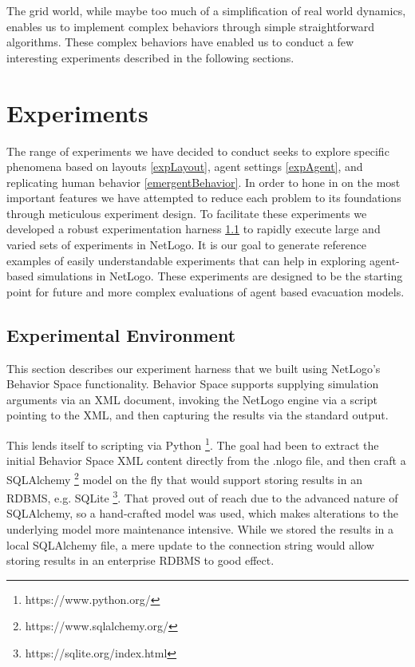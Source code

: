 \documentclass[12pt,letterpaper]{article}
\begin{document}
The grid world, while maybe too much of a simplification of real world dynamics, enables us to implement complex behaviors through simple straightforward algorithms.  These complex behaviors have enabled us to conduct a few interesting experiments described in the following sections.

\section{Experiments}

The range of experiments we have decided to conduct seeks to explore specific phenomena based on layouts \ref{expLayout}, agent settings \ref{expAgent}, and replicating human behavior \ref{emergentBehavior}.  In order to hone in on the most important features we have attempted to reduce each problem to its foundations through meticulous experiment design.  To facilitate these experiments we developed a robust experimentation harness \ref{expEnv} to rapidly execute large and varied sets of experiments in NetLogo.  It is our goal to generate reference examples of easily understandable experiments that can help in exploring agent-based simulations in NetLogo.  These experiments are designed to be the starting point for future and more complex evaluations of agent based evacuation models.


\subsection{Experimental Environment} \label{expEnv}
This section describes our experiment harness that we built using NetLogo's
Behavior Space functionality.  Behavior Space supports supplying simulation arguments via an XML document,
invoking the NetLogo engine via a script pointing to the XML, and then capturing
the results via the standard output.

This lends itself to scripting via Python \footnote{https://www.python.org/}. The goal had been to extract the
initial Behavior Space XML content directly from the .nlogo file, and then craft
a SQLAlchemy \footnote{https://www.sqlalchemy.org/} model on the fly that would support storing results in an RDBMS,
e.g. SQLite \footnote{https://sqlite.org/index.html}. That proved out of reach due to the advanced nature of SQLAlchemy,
so a hand-crafted model was used, which makes alterations to the underlying
model more maintenance intensive.  While we stored the results in a local SQLAlchemy file, a mere update to the
connection string would allow storing results in an enterprise RDBMS to good
effect.
\end{document}
